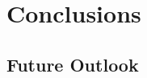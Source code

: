 \documentclass[oneside, letterpaper, 12pt, oldfontcommands]{memoir}
\begin{document}



\chapter{Conclusions}
\section{Future Outlook}



\end{document}
